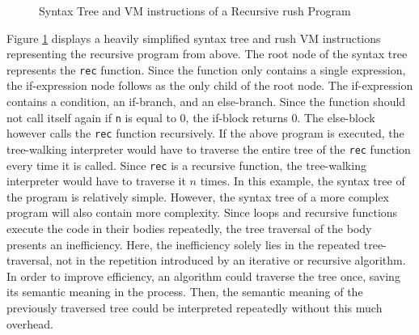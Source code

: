 \noindent
\begin{figure}[h]
	\begin{minipage}{.7\textwidth}
	\end{minipage}%
	\begin{minipage}{.3\textwidth}
	\end{minipage}
	\caption{Syntax Tree and VM instructions of a Recursive rush Program}
	\label{fig:tree_vs_vm}
\end{figure}

Figure \ref{fig:tree_vs_vm} displays a heavily simplified syntax tree and rush VM instructions representing the recursive program from above.
The root node of the syntax tree represents the \texttt{rec} function.
Since the function only contains a single expression, the if-expression node follows as the only child of the root node.
The if-expression contains a condition, an if-branch, and an else-branch.
Since the function should not call itself again if \texttt{n} is equal to 0, the if-block returns 0.
The else-block however calls the \texttt{rec} function recursively.
If the above program is executed, the tree-walking interpreter would have to traverse the entire tree of the \texttt{rec} function every time it is called.
Since \texttt{rec} is a recursive function, the tree-walking interpreter would have to traverse it $n$ times.
In this example, the syntax tree of the program is relatively simple.
However, the syntax tree of a more complex program will also contain more complexity.
Since loops and recursive functions execute the code in their bodies repeatedly, the tree traversal of the body presents an inefficiency.
Here, the inefficiency solely lies in the repeated tree-traversal, not in the repetition introduced by an iterative or recursive algorithm.
In order to improve efficiency, an algorithm could traverse the tree once, saving its semantic meaning in the process.
Then, the semantic meaning of the previously traversed tree could be interpreted repeatedly without this much overhead.

